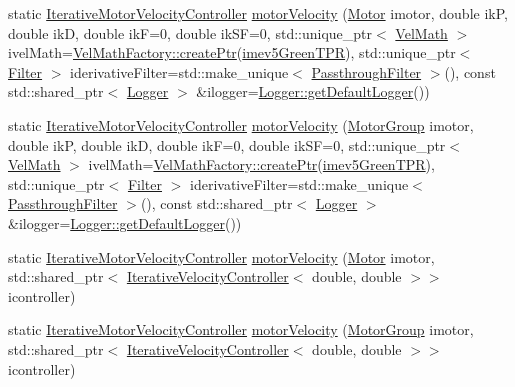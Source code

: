 \begin{DoxyCompactItemize}
static \mbox{\hyperlink{classokapi_1_1IterativeMotorVelocityController}{Iterative\+Motor\+Velocity\+Controller}} \mbox{\hyperlink{classokapi_1_1IterativeControllerFactory_a55d93373ed17166b0f5747a76690d1de}{motor\+Velocity}} (\mbox{\hyperlink{classokapi_1_1Motor}{Motor}} imotor, double ikP, double ikD, double ikF=0, double ik\+SF=0, std\+::unique\+\_\+ptr$<$ \mbox{\hyperlink{classokapi_1_1VelMath}{Vel\+Math}} $>$ ivel\+Math=\mbox{\hyperlink{classokapi_1_1VelMathFactory_a26b75e227e114812131c64d17015948f}{Vel\+Math\+Factory\+::create\+Ptr}}(\mbox{\hyperlink{namespaceokapi_a5263bab3bfecd482a573b6d04fb584ac}{imev5\+Green\+T\+PR}}), std\+::unique\+\_\+ptr$<$ \mbox{\hyperlink{classokapi_1_1Filter}{Filter}} $>$ iderivative\+Filter=std\+::make\+\_\+unique$<$ \mbox{\hyperlink{classokapi_1_1PassthroughFilter}{Passthrough\+Filter}} $>$(), const std\+::shared\+\_\+ptr$<$ \mbox{\hyperlink{classokapi_1_1Logger}{Logger}} $>$ \&ilogger=\mbox{\hyperlink{classokapi_1_1Logger_a5053cf778b4b55acba788a3797dc96d2}{Logger\+::get\+Default\+Logger}}())
\item 
static \mbox{\hyperlink{classokapi_1_1IterativeMotorVelocityController}{Iterative\+Motor\+Velocity\+Controller}} \mbox{\hyperlink{classokapi_1_1IterativeControllerFactory_a5227fff05674d0165c02e02730a2a4c6}{motor\+Velocity}} (\mbox{\hyperlink{classokapi_1_1MotorGroup}{Motor\+Group}} imotor, double ikP, double ikD, double ikF=0, double ik\+SF=0, std\+::unique\+\_\+ptr$<$ \mbox{\hyperlink{classokapi_1_1VelMath}{Vel\+Math}} $>$ ivel\+Math=\mbox{\hyperlink{classokapi_1_1VelMathFactory_a26b75e227e114812131c64d17015948f}{Vel\+Math\+Factory\+::create\+Ptr}}(\mbox{\hyperlink{namespaceokapi_a5263bab3bfecd482a573b6d04fb584ac}{imev5\+Green\+T\+PR}}), std\+::unique\+\_\+ptr$<$ \mbox{\hyperlink{classokapi_1_1Filter}{Filter}} $>$ iderivative\+Filter=std\+::make\+\_\+unique$<$ \mbox{\hyperlink{classokapi_1_1PassthroughFilter}{Passthrough\+Filter}} $>$(), const std\+::shared\+\_\+ptr$<$ \mbox{\hyperlink{classokapi_1_1Logger}{Logger}} $>$ \&ilogger=\mbox{\hyperlink{classokapi_1_1Logger_a5053cf778b4b55acba788a3797dc96d2}{Logger\+::get\+Default\+Logger}}())
\item 
static \mbox{\hyperlink{classokapi_1_1IterativeMotorVelocityController}{Iterative\+Motor\+Velocity\+Controller}} \mbox{\hyperlink{classokapi_1_1IterativeControllerFactory_a10580d88f6c4d2f4b7355068c1ab3def}{motor\+Velocity}} (\mbox{\hyperlink{classokapi_1_1Motor}{Motor}} imotor, std\+::shared\+\_\+ptr$<$ \mbox{\hyperlink{classokapi_1_1IterativeVelocityController}{Iterative\+Velocity\+Controller}}$<$ double, double $>$$>$ icontroller)
\item 
static \mbox{\hyperlink{classokapi_1_1IterativeMotorVelocityController}{Iterative\+Motor\+Velocity\+Controller}} \mbox{\hyperlink{classokapi_1_1IterativeControllerFactory_ac8c7d72464d57e7d891b13aab9d9efbb}{motor\+Velocity}} (\mbox{\hyperlink{classokapi_1_1MotorGroup}{Motor\+Group}} imotor, std\+::shared\+\_\+ptr$<$ \mbox{\hyperlink{classokapi_1_1IterativeVelocityController}{Iterative\+Velocity\+Controller}}$<$ double, double $>$$>$ icontroller)
\end{DoxyCompactItemize}


